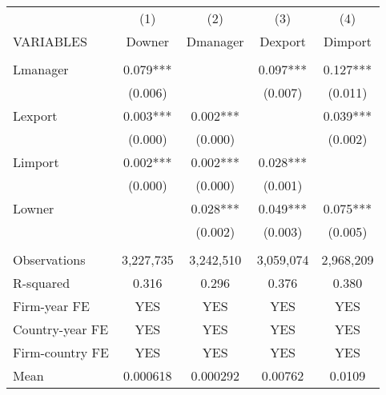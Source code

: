 \begin{tabular}{lcccc} \hline
 & (1) & (2) & (3) & (4) \\
VARIABLES & Downer & Dmanager & Dexport & Dimport \\ \hline
 &  &  &  &  \\
Lmanager & 0.079*** &  & 0.097*** & 0.127*** \\
 & (0.006) &  & (0.007) & (0.011) \\
Lexport & 0.003*** & 0.002*** &  & 0.039*** \\
 & (0.000) & (0.000) &  & (0.002) \\
Limport & 0.002*** & 0.002*** & 0.028*** &  \\
 & (0.000) & (0.000) & (0.001) &  \\
Lowner &  & 0.028*** & 0.049*** & 0.075*** \\
 &  & (0.002) & (0.003) & (0.005) \\
 &  &  &  &  \\
Observations & 3,227,735 & 3,242,510 & 3,059,074 & 2,968,209 \\
R-squared & 0.316 & 0.296 & 0.376 & 0.380 \\
Firm-year FE & YES & YES & YES & YES \\
Country-year FE & YES & YES & YES & YES \\
Firm-country FE & YES & YES & YES & YES \\
 Mean & 0.000618 & 0.000292 & 0.00762 & 0.0109 \\ \hline
\end{tabular}
